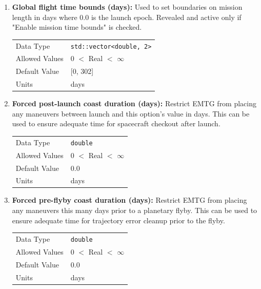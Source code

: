 \begin{enumerate}
    \item \textbf{Global flight time bounds (days):} Used to set boundaries on mission length in days where 0.0 is the launch epoch. Revealed and active only if "Enable mission time bounds" is checked.
    
        \begin{table}[H]
            \hspace{2cm}
            \begin{tabular}{ll}
            Data Type & \verb|std::vector<double, 2>| \\
            Allowed Values & 0 $<$ Real $<$ $\infty$ \\
            Default Value & [0, 302] \\
            Units & days
            \end{tabular}
        \end{table}

    \item \textbf{Forced post-launch coast duration (days):} Restrict \ac{EMTG} from placing any maneuvers between launch and this option's value in days. This can be used to ensure adequate time for spacecraft checkout after launch.
    
        \begin{table}[H]
            \hspace{2cm}
            \begin{tabular}{ll}
            Data Type & \verb|double| \\
            Allowed Values & 0 $<$ Real $<$ $\infty$ \\
            Default Value & 0.0 \\
            Units & days
            \end{tabular}
        \end{table}

    \item \textbf{Forced pre-flyby coast duration (days):} Restrict \ac{EMTG} from placing any maneuvers this many days prior to a planetary flyby. This can be used to ensure adequate time for trajectory error cleanup prior to the flyby.
    
        \begin{table}[H]
            \hspace{2cm}
            \begin{tabular}{ll}
            Data Type & \verb|double| \\
            Allowed Values & 0 $<$ Real $<$ $\infty$ \\
            Default Value & 0.0 \\
            Units & days
            \end{tabular}
        \end{table}


\end{enumerate}
